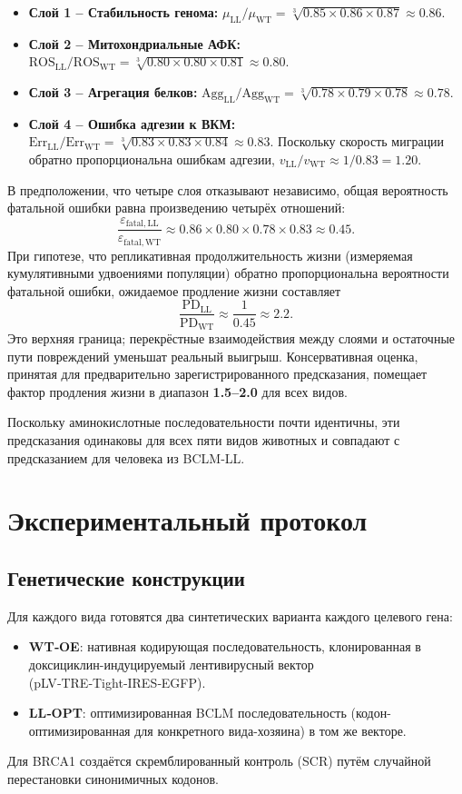 \documentclass[12pt,a4paper]{article}
\begin{document}
	\begin{itemize}
		\item \textbf{Слой 1 – Стабильность генома:} \(\mu_{\mathrm{LL}}/\mu_{\mathrm{WT}} = \sqrt[3]{0.85\times0.86\times0.87} \approx 0.86\).
		\item \textbf{Слой 2 – Митохондриальные АФК:} \(\mathrm{ROS}_{\mathrm{LL}}/\mathrm{ROS}_{\mathrm{WT}} = \sqrt[3]{0.80\times0.80\times0.81} \approx 0.80\).
		\item \textbf{Слой 3 – Агрегация белков:} \(\mathrm{Agg}_{\mathrm{LL}}/\mathrm{Agg}_{\mathrm{WT}} = \sqrt[3]{0.78\times0.79\times0.78} \approx 0.78\).
		\item \textbf{Слой 4 – Ошибка адгезии к ВКМ:} \(\mathrm{Err}_{\mathrm{LL}}/\mathrm{Err}_{\mathrm{WT}} = \sqrt[3]{0.83\times0.83\times0.84} \approx 0.83\). Поскольку скорость миграции обратно пропорциональна ошибкам адгезии, \(v_{\mathrm{LL}}/v_{\mathrm{WT}} \approx 1/0.83 = 1.20\).
	\end{itemize}
	
	В предположении, что четыре слоя отказывают независимо, общая вероятность фатальной ошибки равна произведению четырёх отношений:
	\[
	\frac{\varepsilon_{\mathrm{fatal,LL}}}{\varepsilon_{\mathrm{fatal,WT}}} \approx 0.86 \times 0.80 \times 0.78 \times 0.83 \approx 0.45.
	\]
	При гипотезе, что репликативная продолжительность жизни (измеряемая кумулятивными удвоениями популяции) обратно пропорциональна вероятности фатальной ошибки, ожидаемое продление жизни составляет
	\[
	\frac{\mathrm{PD}_{\mathrm{LL}}}{\mathrm{PD}_{\mathrm{WT}}} \approx \frac{1}{0.45} \approx 2.2.
	\]
	Это верхняя граница; перекрёстные взаимодействия между слоями и остаточные пути повреждений уменьшат реальный выигрыш. Консервативная оценка, принятая для предварительно зарегистрированного предсказания, помещает фактор продления жизни в диапазон \textbf{1.5–2.0} для всех видов.
	
	Поскольку аминокислотные последовательности почти идентичны, эти предсказания одинаковы для всех пяти видов животных и совпадают с предсказанием для человека из BCLM‑LL.
	
	\section{Экспериментальный протокол}
	\label{sec:protocol}
	
	\subsection{Генетические конструкции}
	Для каждого вида готовятся два синтетических варианта каждого целевого гена:
	\begin{itemize}
		\item \textbf{WT‑OE}: нативная кодирующая последовательность, клонированная в доксициклин-индуцируемый лентивирусный вектор (pLV‑TRE‑Tight‑IRES‑EGFP).
		\item \textbf{LL‑OPT}: оптимизированная BCLM последовательность (кодон-оптимизированная для конкретного вида-хозяина) в том же векторе.
	\end{itemize}
	Для BRCA1 создаётся скремблированный контроль (SCR) путём случайной перестановки синонимичных кодонов.
	
\end{document}
